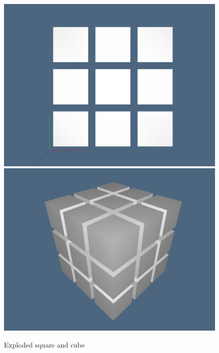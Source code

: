 \documentclass{article}
\begin{document}
\begin{figure}[h!]
\centering
\includegraphics[scale=0.5]{celleEsplose.jpg}
\includegraphics[scale=0.5]{celleEsplose2.jpg}
\caption{Exploded square and cube}
\end{figure}
\end{document}
